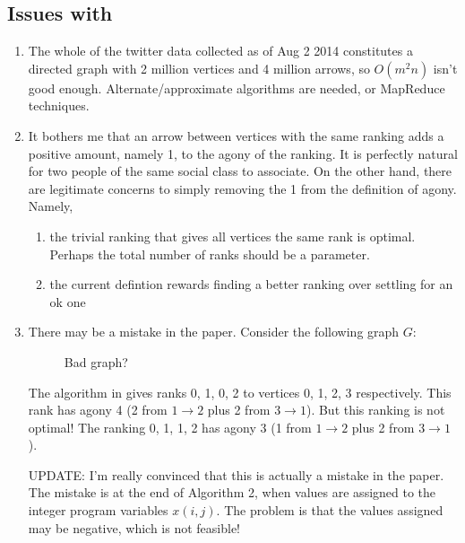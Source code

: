 \documentclass[11pt]{amsart}
\begin{document}
\subsection{Issues with \cite{hier1}} 
\begin{enumerate}
\item The whole of the twitter data collected as of Aug 2 2014 constitutes a directed graph with 2 million vertices and 4 million arrows, so $O(m^2n)$ isn't good enough. Alternate/approximate algorithms are needed, or MapReduce techniques.
\item It bothers me that an arrow between vertices with the same ranking adds a positive amount, namely 1, to the agony of the ranking. It is perfectly natural for two people of the same social class to associate. On the other hand, there are legitimate concerns to simply removing the 1 from the definition of agony. Namely,
\begin{enumerate}
\item the trivial ranking that gives all vertices the same rank is optimal. Perhaps the total number of ranks should be a parameter.
\item the current defintion rewards finding a better ranking over settling for an ok one
\end{enumerate}
\item There may be a mistake in the paper. Consider the following graph $G$:
\begin{figure}[h]
\centering
{}
\caption{Bad graph?}
\label{gen}
\end{figure}
The algorithm in \cite{hier1} gives ranks 0, 1, 0, 2 to vertices 0, 1, 2, 3 respectively. This rank has agony 4 (2 from $1 \to 2$ plus 2 from $3 \to 1$). But this ranking is not optimal! The ranking 0, 1, 1, 2 has agony 3 (1 from $1 \to 2$ plus 2 from $3 \to 1$). 

UPDATE: I'm really convinced that this is actually a mistake in the paper. The mistake is at the end of Algorithm 2, when values are assigned to the integer program variables $x(i,j)$. The problem is that the values assigned may be negative, which is not feasible!


\end{enumerate}
\end{document}

